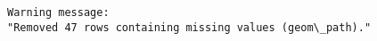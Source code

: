 \documentclass[11pt]{article}
\begin{document}
    \begin{Verbatim}[commandchars=\\\{\}]
Warning message:
"Removed 47 rows containing missing values (geom\_path)."
    \end{Verbatim}

    
    
    \begin{center}
    \end{center}
    { \hspace*{\fill} \\}
    

    
    
    
    
\end{document}
